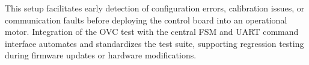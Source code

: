 This setup facilitates early detection of configuration errors, calibration issues, or communication faults before deploying the control board into an operational motor. Integration of the \acs{OVC} test with the central \acs{FSM} and \acs{UART} command interface automates and standardizes the test suite, supporting regression testing during firmware updates or hardware modifications.

